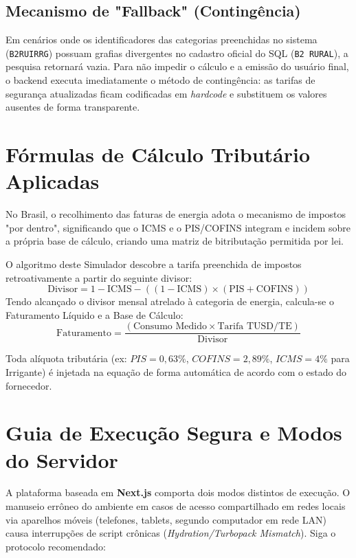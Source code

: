 \documentclass[12pt,a4paper]{article}
\begin{document}
\subsection{Mecanismo de "Fallback" (Contingência)}
Em cenários onde os identificadores das categorias preenchidas no sistema (\texttt{B2RUIRRG}) possuam grafias divergentes no cadastro oficial do SQL (\texttt{B2 RURAL}), a pesquisa retornará vazia. Para não impedir o cálculo e a emissão do usuário final, o backend executa imediatamente o método de contingência: as tarifas de segurança atualizadas ficam codificadas em \textit{hardcode} e substituem os valores ausentes de forma transparente.

\section{Fórmulas de Cálculo Tributário Aplicadas}
No Brasil, o recolhimento das faturas de energia adota o mecanismo de impostos "por dentro", significando que o ICMS e o PIS/COFINS integram e incidem sobre a própria base de cálculo, criando uma matriz de bitributação permitida por lei.

O algoritmo deste Simulador descobre a tarifa preenchida de impostos retroativamente a partir do seguinte divisor:
\begin{equation}
\text{Divisor} = 1 - \text{ICMS} - ((1 - \text{ICMS}) \times (\text{PIS} + \text{COFINS}))
\end{equation}
Tendo alcançado o divisor mensal atrelado à categoria de energia, calcula-se o Faturamento Líquido e a Base de Cálculo:
\begin{equation}
\text{Faturamento} = \frac{(\text{Consumo Medido} \times \text{Tarifa TUSD/TE})}{\text{Divisor}}
\end{equation}

Toda alíquota tributária (ex: $PIS=0,63\%$, $COFINS=2,89\%$, $ICMS=4\%$ para Irrigante) é injetada na equação de forma automática de acordo com o estado do fornecedor.

\section{Guia de Execução Segura e Modos do Servidor}

A plataforma baseada em \textbf{Next.js} comporta dois modos distintos de execução. O manuseio errôneo do ambiente em casos de acesso compartilhado em redes locais via aparelhos móveis (telefones, tablets, segundo computador em rede LAN) causa interrupções de script crônicas (\textit{Hydration/Turbopack Mismatch}). Siga o protocolo recomendado:
\end{document}
